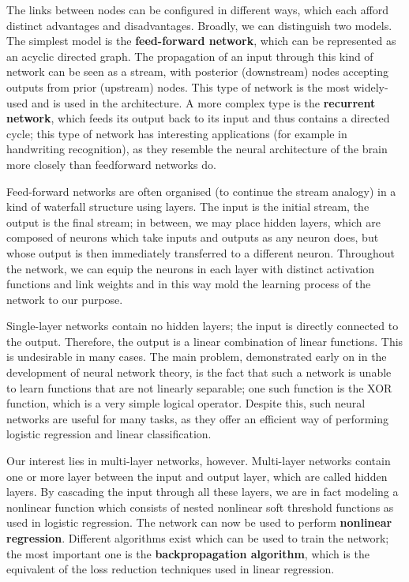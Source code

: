 The links between nodes can be configured in different ways, which
each afford distinct advantages and disadvantages. Broadly, we can
distinguish two models. The simplest model is the \textbf{feed-forward
network}, which can be represented as an acyclic directed graph. The
propagation of an input through this kind of network can be seen as a
stream, with posterior (downstream) nodes accepting outputs from prior
(upstream) nodes. This type of network is the most widely-used and is
used in the architecture. A more complex type is the \textbf{recurrent
network}, which feeds its output back to its input and thus contains a
directed cycle; this type of network has interesting applications (for
example in handwriting recognition), as they resemble the neural
architecture of the brain more closely than feedforward networks do.

Feed-forward networks are often organised (to continue the stream
analogy) in a kind of waterfall structure using layers. The input is
the initial stream, the output is the final stream; in between, we may
place hidden layers, which are composed of neurons which take inputs
and outputs as any neuron does, but whose output is then immediately
transferred to a different neuron. Throughout the network, we can
equip the neurons in each layer with distinct activation functions and
link weights and in this way mold the learning process of the network
to our purpose.

Single-layer networks contain no hidden layers; the input is directly
connected to the output. Therefore, the output is a linear combination
of linear functions. This is undesirable in many cases. The main
problem, demonstrated early on in the development of neural network
theory, is the fact that such a network is unable to learn functions
that are not linearly separable; one such function is the XOR
function, which is a very simple logical operator. Despite this, such
neural networks are useful for many tasks, as they offer an efficient
way of performing logistic regression and linear classification.

Our interest lies in multi-layer networks, however. Multi-layer
networks contain one or more layer between the input and output layer,
which are called hidden layers. By cascading the input through all
these layers, we are in fact modeling a nonlinear function which
consists of nested nonlinear soft threshold functions as used in
logistic regression. The network can now be used to perform \textbf{nonlinear
regression}. Different algorithms exist which can be used to train the
network; the most important one is the \textbf{backpropagation algorithm},
which is the equivalent of the loss reduction techniques used in
linear regression.

